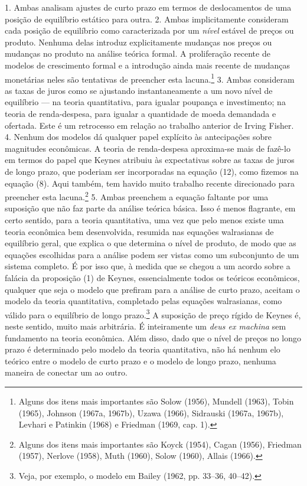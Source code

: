 \documentclass[12pt]{article}
\begin{document}
1. Ambas analisam ajustes de curto prazo em termos de deslocamentos de uma posição de equilíbrio estático para outra.
2. Ambas implicitamente consideram cada posição de equilíbrio como caracterizada por um \textit{nível} estável de preços ou produto. Nenhuma delas introduz explicitamente mudanças nos preços ou mudanças no produto na análise teórica formal. A proliferação recente de modelos de crescimento formal e a introdução ainda mais recente de mudanças monetárias neles são tentativas de preencher esta lacuna.\footnote{Alguns dos itens mais importantes são Solow (1956), Mundell (1963), Tobin (1965), Johnson (1967a, 1967b), Uzawa (1966), Sidrauski (1967a, 1967b), Levhari e Patinkin (1968) e Friedman (1969, cap. 1).}
3. Ambas consideram as taxas de juros como se ajustando instantaneamente a um novo nível de equilíbrio — na teoria quantitativa, para igualar poupança e investimento; na teoria de renda-despesa, para igualar a quantidade de moeda demandada e ofertada. Este é um retrocesso em relação ao trabalho anterior de Irving Fisher.
4. Nenhum dos modelos dá qualquer papel explícito às antecipações sobre magnitudes econômicas. A teoria de renda-despesa aproxima-se mais de fazê-lo em termos do papel que Keynes atribuiu às expectativas sobre as taxas de juros de longo prazo, que poderiam ser incorporadas na equação (12), como fizemos na equação (8). Aqui também, tem havido muito trabalho recente direcionado para preencher esta lacuna.\footnote{Alguns dos itens mais importantes são Koyck (1954), Cagan (1956), Friedman (1957), Nerlove (1958), Muth (1960), Solow (1960), Allais (1966).}
5. Ambas preenchem a equação faltante por uma suposição que não faz parte da análise teórica básica. Isso é menos flagrante, em certo sentido, para a teoria quantitativa, uma vez que pelo menos existe uma teoria econômica bem desenvolvida, resumida nas equações walrasianas de equilíbrio geral, que explica o que determina o nível de produto, de modo que as equações escolhidas para a análise podem ser vistas como um subconjunto de um sistema completo. É por isso que, à medida que se chegou a um acordo sobre a falácia da proposição (1) de Keynes, essencialmente todos os teóricos econômicos, qualquer que seja o modelo que prefiram para a análise de curto prazo, aceitam o modelo da teoria quantitativa, completado pelas equações walrasianas, como válido para o equilíbrio de longo prazo.\footnote{Veja, por exemplo, o modelo em Bailey (1962, pp. 33–36, 40–42).} A suposição de preço rígido de Keynes é, neste sentido, muito mais arbitrária. É inteiramente um \textit{deus ex machina} sem fundamento na teoria econômica. Além disso, dado que o nível de preços no longo prazo é determinado pelo modelo da teoria quantitativa, não há nenhum elo teórico entre o modelo de curto prazo e o modelo de longo prazo, nenhuma maneira de conectar um ao outro.
\end{document}
